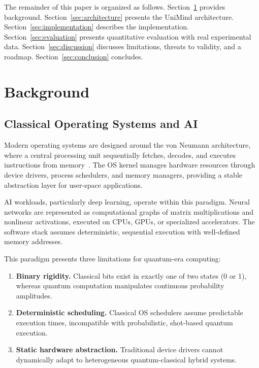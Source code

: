 ﻿\documentclass[12pt,a4paper]{article}
\begin{document}
The remainder of this paper is organized as follows. Section~\ref{sec:background} provides background. Section~\ref{sec:architecture} presents the UniMind architecture. Section~\ref{sec:implementation} describes the implementation. Section~\ref{sec:evaluation} presents quantitative evaluation with real experimental data. Section~\ref{sec:discussion} discusses limitations, threats to validity, and a roadmap. Section~\ref{sec:conclusion} concludes.


\section{Background}\label{sec:background}

\subsection{Classical Operating Systems and AI}

Modern operating systems are designed around the von Neumann architecture, where a central processing unit sequentially fetches, decodes, and executes instructions from memory~\cite{tanenbaum2023}. The OS kernel manages hardware resources through device drivers, process schedulers, and memory managers, providing a stable abstraction layer for user-space applications.

AI workloads, particularly deep learning, operate within this paradigm. Neural networks are represented as computational graphs of matrix multiplications and nonlinear activations, executed on CPUs, GPUs, or specialized accelerators. The software stack assumes deterministic, sequential execution with well-defined memory addresses.

This paradigm presents three limitations for quantum-era computing:

\begin{enumerate}[leftmargin=2em]
    \item \textbf{Binary rigidity.} Classical bits exist in exactly one of two states (0 or 1), whereas quantum computation manipulates continuous probability amplitudes.
    \item \textbf{Deterministic scheduling.} Classical OS schedulers assume predictable execution times, incompatible with probabilistic, shot-based quantum execution.
    \item \textbf{Static hardware abstraction.} Traditional device drivers cannot dynamically adapt to heterogeneous quantum-classical hybrid systems.
\end{enumerate}
\end{document}
